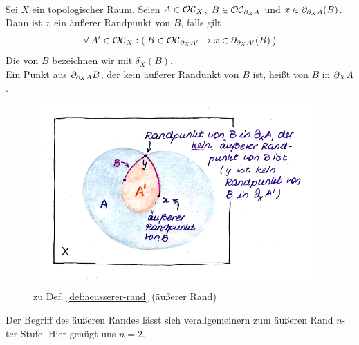     \begin{dfn}\label{def:aeusserer-rand} \ \vspace{8pt}

        \noindent
        Sei $X$ ein topologischer Raum.
        Seien $A \in \mathcal{OC}_X$, $B \in \mathcal{OC}_{\partial_X A}$ und $x \in \partial_{\partial_X A}(B)$. Dann ist $x$ ein äußerer Randpunkt von $B$, falls gilt
        \begin{align*}
            \forall\: A' \in \mathcal{OC}_X : (\: B \in \mathcal{OC}_{\partial_X A'} \rightarrow x \in \partial_{\partial_X A'}(B) \:)
        \end{align*}
        Die  von $B$ bezeichnen wir mit $\delta_X(B)$.\\
        Ein Punkt aus $\partial_{\partial_X A} B$, der kein äußerer Randunkt von $B$ ist, heißt  von $B$ in $\partial_X A$.
    \end{dfn}


    \begin{figure}[ht]
        \centering
        \includegraphics[height=7cm]{abb/aeusserer-rand.png}
        \caption{zu Def. \ref{def:aeusserer-rand} (äußerer Rand)}
        \label{fig:aeus-rand}
    \end{figure}
    
% 
% 
    
    Der
    Begriff des äußeren Randes lässt sich verallgemeinern zum äußeren Rand $n$-ter Stufe. Hier genügt uns $n = 2$.
    
